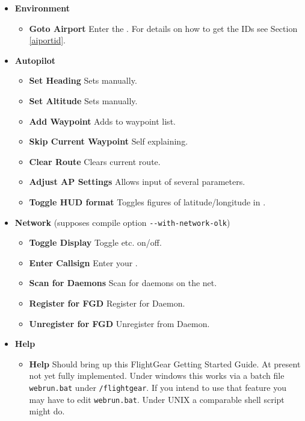 \begin{itemize}
\item \textbf{Environment}
 \begin{itemize}
 \item \textbf{Goto Airport} Enter the . For details on how to get the IDs
  see Section \ref{aiportid}.
 \end{itemize}

 \item \textbf{Autopilot}
 \begin{itemize}
 \item \textbf{Set Heading} Sets  manually.
 \item \textbf{Set Altitude} Sets  manually.
 \item \textbf{Add Waypoint} Adds  to waypoint list.
 \item \textbf{Skip Current Waypoint} Self explaining.
 \item \textbf{Clear Route} Clears current route.
 \item \textbf{Adjust AP Settings} Allows input of several  parameters.
 \item \textbf{Toggle HUD format} Toggles figures of latitude/longitude in .
 \end{itemize}
 
 \item\textbf{Network} (supposes compile option \texttt{-$ $-with-network-olk})
 \begin{itemize}
 \item \textbf{Toggle Display} Toggle  etc. on/off.
 \item \textbf{Enter Callsign} Enter your .
 \item \textbf{Scan for Daemons} Scan for daemons on the net.
 \item \textbf{Register for FGD} Register for \FlightGear{} Daemon.
 \item \textbf{Unregister for FGD} Unregister from \FlightGear{} Daemon.
 \end{itemize}

 \item \textbf{Help}
 \begin{itemize}
 \item \textbf{Help} Should bring up this FlightGear Getting Started
 Guide. At present not yet fully
 implemented. Under windows this works via a batch file
  \texttt{webrun.bat} under \texttt{/flightgear}. If you intend to use that feature you
  may have to edit \texttt{webrun.bat}. Under UNIX a
comparable shell script might do. 
 \end{itemize}
\end{itemize}


